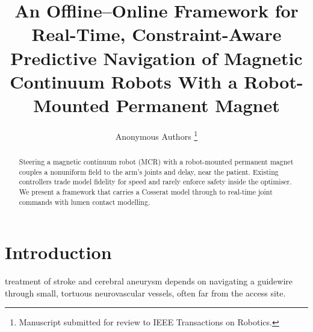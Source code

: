 \documentclass[journal]{IEEEtran}
\begin{document}
\title{An Offline--Online Framework for Real-Time, Constraint-Aware
Predictive Navigation of Magnetic Continuum Robots With a Robot-Mounted
Permanent Magnet}

\author{Anonymous Authors%
\thanks{Manuscript submitted for review to IEEE Transactions on Robotics.}}


\maketitle

\begin{abstract}
Steering a magnetic continuum robot (MCR) with a robot-mounted permanent
magnet couples a nonuniform field to the arm's joints and delay, near
the patient. Existing controllers trade model fidelity for speed and rarely enforce
safety inside the optimiser. We present a framework that carries a Cosserat model through to
real-time joint commands with lumen contact modelling.
\end{abstract}

\begin{IEEEkeywords}

\end{IEEEkeywords}

\section{Introduction}
\label{sec:intro}

 treatment of stroke and cerebral aneurysm
depends on navigating a guidewire through small, tortuous neurovascular
vessels, often far from the access site. 
\end{document}
